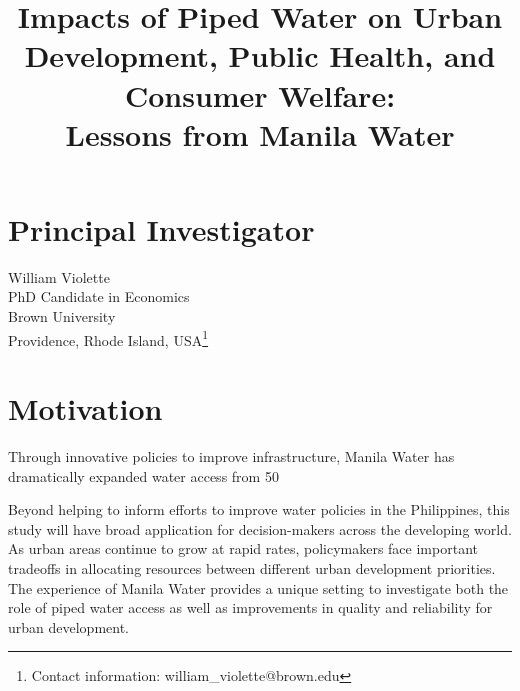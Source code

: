 \documentclass{article}
\title{\sc Impacts of Piped Water on Urban Development, Public Health, and Consumer Welfare: \\ Lessons from Manila Water}
\begin{document}
\maketitle

\large 



\section*{Principal Investigator}

William Violette \\
PhD Candidate in Economics \\
Brown University \\
Providence, Rhode Island, USA\footnote{Contact information: william\_violette@brown.edu}

\section*{Motivation}

Through innovative policies to improve infrastructure, Manila Water has dramatically expanded water access from 50%

Beyond helping to inform efforts to improve water policies in the Philippines, this study will have broad application for decision-makers across the developing world.  As urban areas continue to grow at rapid rates, policymakers face important tradeoffs in allocating resources between different urban development priorities.  The experience of Manila Water provides a unique setting to investigate both the role of piped water access as well as improvements in quality and reliability for urban development.
\end{document}
